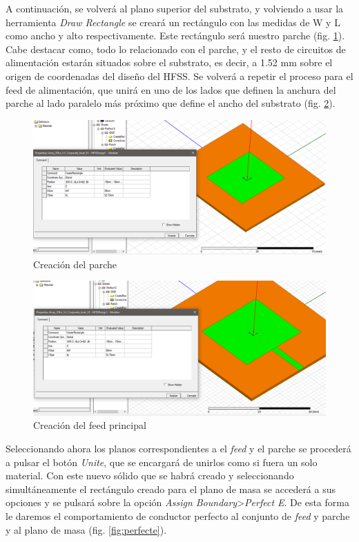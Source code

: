 \par A continuación, se volverá al plano superior del substrato, y volviendo a usar la herramienta \textit{Draw Rectangle} se creará un rectángulo con las medidas de W y L como ancho y alto respectivamente. Este rectángulo será nuestro parche (fig. \ref{fig:parche}). Cabe destacar como, todo lo relacionado con el parche, y el resto de circuitos de alimentación estarán situados sobre el substrato, es decir, a 1.52 mm sobre el origen de coordenadas del diseño del HFSS. Se volverá a repetir el proceso para el feed de alimentación, que unirá en uno de los lados que definen la anchura del parche al lado paralelo más próximo que define el ancho del substrato (fig. \ref{fig:feed}).
\\ 
\begin{figure}[p]
    \centering
        \includegraphics[width=\textwidth]{archivos/desarrollo/3}
        \caption{Creación del parche}
        \label{fig:parche}
\end{figure}
\begin{figure}[p]
    \centering
        \includegraphics[width=\textwidth]{archivos/desarrollo/4}
        \caption{Creación del feed principal}
        \label{fig:feed}
\end{figure}
\par Seleccionando ahora los planos correspondientes a el \textit{feed} y el parche se procederá a pulsar el botón \textit{Unite}, que se encargará de unirlos como si fuera un solo material. Con este nuevo sólido que se habrá creado y seleccionando simultáneamente el rectángulo creado para el plano de masa se accederá a sus opciones y se pulsará sobre la opción \textit{Assign Boundary}>\textit{Perfect E}. De esta forma le daremos el comportamiento de conductor perfecto al conjunto de \textit{feed} y parche y al plano de masa (fig. \ref{fig:perfecte}). 
